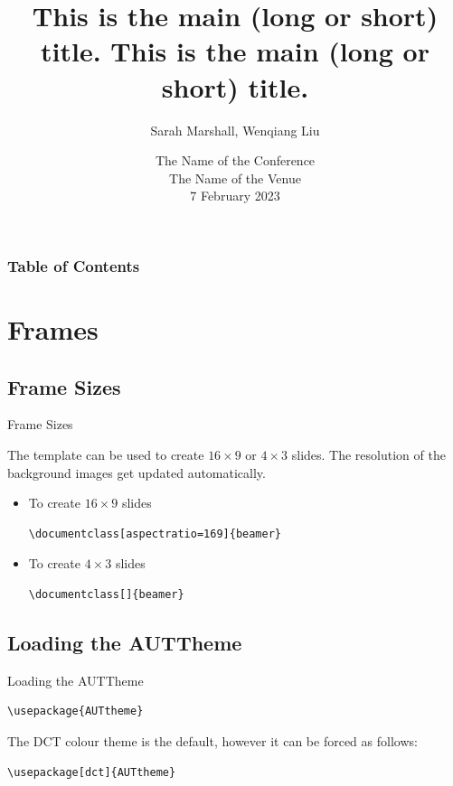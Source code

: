 \documentclass[aspectratio=169, 12pt]{beamer}    %
\title[Beamer title]
{This is the main (long or short) title. This is the main (long or short) title.
}
\author[Sarah, Wenqiang]{Sarah Marshall\inst{1}, Wenqiang Liu\inst{2}}
\institute
{\inst{1}  Engineering, Computer Mathematical Sciences (ECMS) \\
\inst{2}  Engineering, Computer Mathematical Sciences (ECMS) \\
\inst{3}  Engineering, Computer Mathematical Sciences (ECMS) 
}
\date{The Name of the Conference \\ The Name of the Venue \\
7 February 2023
}
\begin{document}

\begin{frame}
    \maketitle
\end{frame}


\begin{sectionframe}
\frametitle{Table of Contents}
\tableofcontents[hideallsubsections]
\end{sectionframe}



\section{Frames}


\subsection{Frame Sizes}
\begin{frame}[fragile = singleslide]{Frame Sizes}

The template can be used to create $16\times9$ or $4 \times 3$ slides.
The resolution of the background images get updated automatically.

\begin{itemize}
\item To create $16 \times 9$ slides
\begin{verbatim}
\documentclass[aspectratio=169]{beamer} 
\end{verbatim}

\item To create $4 \times 3$ slides
\begin{verbatim}
\documentclass[]{beamer}  
\end{verbatim}

\end{itemize} 


\end{frame}

\subsection{Loading the AUTTheme}
\begin{frame}[fragile = singleslide]{Loading the AUTTheme}
 
\begin{verbatim}
\usepackage{AUTtheme}  
\end{verbatim}

The DCT colour theme is the default, however it can be forced as follows:
\begin{verbatim}
\usepackage[dct]{AUTtheme}  
\end{verbatim}


\end{frame}
\end{document}
